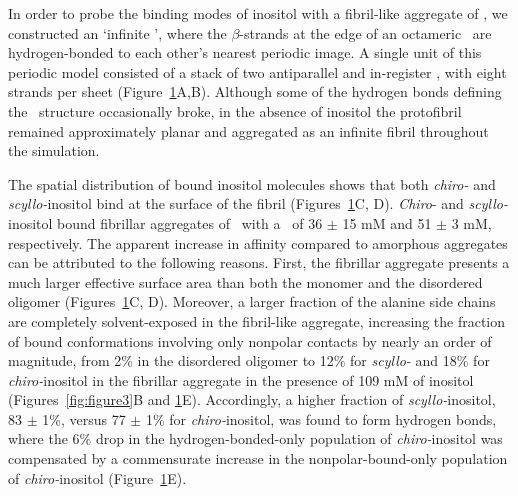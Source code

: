 \begin{figure}[htbp]
   \label{fig:figure6}
\end{figure}

In order to probe the binding modes of inositol with a fibril-like aggregate of \gafour, we constructed an ‘infinite \bsheet’, where the $\beta$-strands at the edge of an octameric \bsheet\ are hydrogen-bonded to each other’s nearest periodic image. A single unit of this periodic model consisted of a stack of two antiparallel and in-register \bsheets, with eight strands per sheet (Figure~\ref{fig:figure6}A,B). Although some of the hydrogen bonds defining the \bsheet\ structure occasionally broke, in the absence of inositol the protofibril remained approximately planar and aggregated as an infinite fibril throughout the simulation.

The spatial distribution of bound inositol molecules shows that both \textit{chiro-} and \textit{scyllo-}inositol bind at the surface of the fibril (Figures~\ref{fig:figure6}C, D). \textit{Chiro}- and \textit{scyllo-}inositol bound fibrillar aggregates of \gafour\ with a \KD\ of 36 $\pm$ 15 mM and 51 $\pm$ 3 mM, respectively. The apparent increase in affinity compared to amorphous aggregates can be attributed to the following reasons. First, the fibrillar aggregate presents a much larger effective surface area than both the monomer and the disordered oligomer (Figures~\ref{fig:figure6}C, D). Moreover, a larger fraction of the alanine side chains are completely solvent-exposed in the fibril-like aggregate, increasing the fraction of bound conformations involving only nonpolar contacts by nearly an order of magnitude, from 2\% in the disordered oligomer to 12\% for \textit{scyllo-} and 18\% for \textit{chiro-}inositol in the fibrillar aggregate in the presence of 109 mM of inositol (Figures~\ref{fig:figure3}B and \ref{fig:figure6}E). Accordingly, a higher fraction of \textit{scyllo-}inositol, 83 $\pm$ 1\%, versus 77 $\pm$ 1\% for \textit{chiro-}inositol, was found to form hydrogen bonds, where the 6\% drop in the hydrogen-bonded-only population of \textit{chiro-}inositol was compensated by a commensurate increase in the nonpolar-bound-only population of \textit{chiro-}inositol (Figure~\ref{fig:figure6}E).

